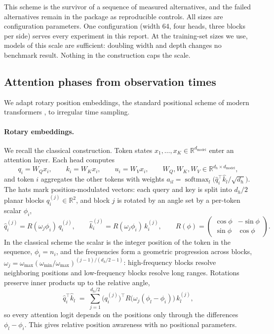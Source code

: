 \documentclass[10pt]{article}
\newcommand{\R}{\mathbb{R}}
\begin{document}
This scheme is the survivor of a sequence of measured alternatives, and the failed alternatives remain
in the package as reproducible controls. All sizes are configuration parameters. One configuration
(width 64, four heads, three blocks per side) serves every experiment in this report. At the
training-set sizes we use, models of this scale are sufficient: doubling width and depth changes no
benchmark result. Nothing in the construction caps the scale.

\subsection{Attention phases from observation times}
\label{sec:trope}

We adapt rotary position embeddings, the standard positional scheme of modern transformers
\citep{su2024}, to irregular time sampling.

\paragraph{Rotary embeddings.} We recall the classical construction. Token states
$x_1, \dots, x_K \in \R^{d_{\mathrm{model}}}$ enter an attention layer. Each head computes
\begin{equation}
  q_i = W_Q x_i, \qquad k_i = W_K x_i, \qquad u_i = W_V x_i,
  \qquad W_Q, W_K, W_V \in \R^{d_h \times d_{\mathrm{model}}},
\end{equation}
and token $i$ aggregates the other tokens with weights
$a_{il} = \operatorname{softmax}_l\bigl(\hat q_i^\top \hat k_l / \sqrt{d_h}\bigr)$. The hats mark
position-modulated vectors: each query and key is split into $d_h/2$ planar blocks
$q_i^{(j)} \in \R^2$, and block $j$ is rotated by an angle set by a per-token scalar $\phi_i$,
\begin{equation}
  \hat q_i^{(j)} = R(\omega_j \phi_i)\, q_i^{(j)}, \qquad
  \hat k_i^{(j)} = R(\omega_j \phi_i)\, k_i^{(j)}, \qquad
  R(\phi) = \begin{pmatrix} \cos\phi & -\sin\phi \\ \sin\phi & \cos\phi \end{pmatrix}.
  \label{eq:trope}
\end{equation}
In the classical scheme the scalar is the integer position of the token in the sequence,
$\phi_i = n_i$, and the frequencies form a geometric progression across blocks,
$\omega_j = \omega_{\max} (\omega_{\min}/\omega_{\max})^{(j-1)/(d_h/2-1)}$: high-frequency blocks
resolve neighboring positions and low-frequency blocks resolve long ranges. Rotations preserve inner
products up to the relative angle,
\begin{equation}
  \hat q_i^{\top} \hat k_l
  \;=\; \sum_{j=1}^{d_h/2} \bigl(q_i^{(j)}\bigr)^{\top} R\bigl(\omega_j (\phi_l - \phi_i)\bigr)\, k_l^{(j)},
  \label{eq:ropeinv}
\end{equation}
so every attention logit depends on the positions only through the differences $\phi_l - \phi_i$.
This gives relative position awareness with no positional parameters.
\end{document}
